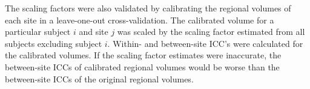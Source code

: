 The scaling factors were also validated by calibrating the regional volumes of each site in a leave-one-out cross-validation. The calibrated volume for a particular subject $i$ and site $j$ was scaled by the scaling factor estimated from all subjects excluding subject $i$. Within- and between-site ICC's were calculated for the calibrated volumes. If the scaling factor estimates were inaccurate, the between-site ICCs of calibrated regional volumes would be worse than the between-site ICCs of the original regional volumes.